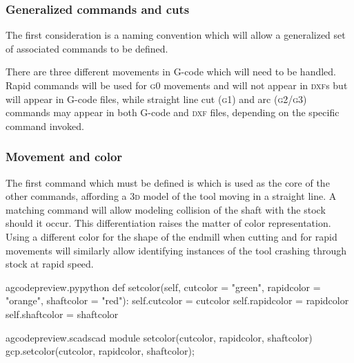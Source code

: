 \documentclass{ltxdoc}
\begin{document}
\subsubsection{Generalized commands and cuts}

The first consideration is a naming convention which will allow a generalized set of associated commands to be defined. 


There are three different movements in G-code which will need to be handled. Rapid commands will be used for \textsc{g0} movements and will not appear in \textsc{dxf}s but will appear in G-code files, while straight line cut (\textsc{g1}) and arc (\textsc{g2/g3}) commands may appear in both G-code and \textsc{dxf} files, depending on the specific command invoked. 

\subsubsection{Movement and color}

The first command which must be defined is  which is used as the core of the other commands, affording a \textsc{3d} model of the tool moving in a straight line. A matching  command will allow modeling collision of the shaft with the stock should it occur. This differentiation raises the matter of color representation. Using a different color for the shape of the endmill when cutting and for rapid movements will similarly allow identifying instances of the tool crashing through stock at rapid speed.


\lstset{firstnumber=\thegcpy}
\begin{writecode}{a}{gcodepreview.py}{python}
    def setcolor(self, 
                  cutcolor = "green",
                  rapidcolor = "orange",
                  shaftcolor = "red"):
        self.cutcolor = cutcolor
        self.rapidcolor = rapidcolor
        self.shaftcolor = shaftcolor

\end{writecode}
\addtocounter{gcpy}{8}

\lstset{firstnumber=\thegcpscad}
\begin{writecode}{a}{gcodepreview.scad}{scad}
module setcolor(cutcolor, rapidcolor, shaftcolor){
    gcp.setcolor(cutcolor, rapidcolor, shaftcolor);
}

\end{writecode}
\addtocounter{gcpscad}{4}
\end{document}
